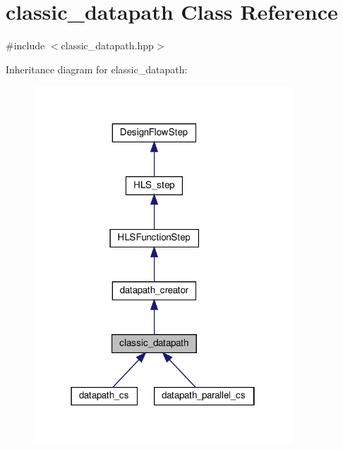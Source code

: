 \hypertarget{classclassic__datapath}{}\section{classic\+\_\+datapath Class Reference}
\label{classclassic__datapath}


{\ttfamily \#include $<$classic\+\_\+datapath.\+hpp$>$}



Inheritance diagram for classic\+\_\+datapath\+:
\nopagebreak
\begin{figure}[H]
\begin{center}
\leavevmode
\includegraphics[width=274pt]{de/d03/classclassic__datapath__inherit__graph}
\end{center}
\end{figure}


